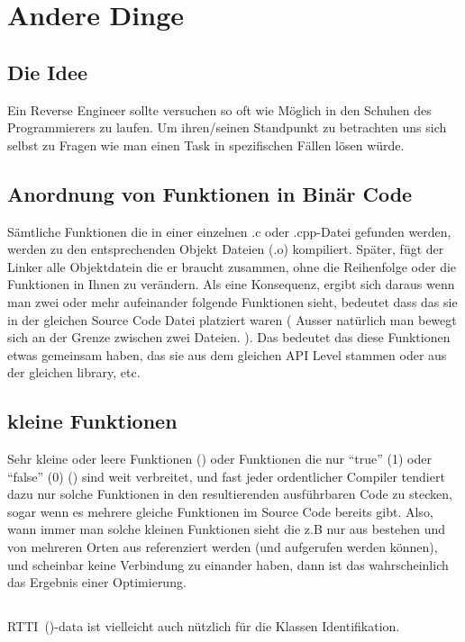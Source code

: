 \section{Andere Dinge}  %

\subsection{Die Idee}  %

Ein Reverse Engineer sollte versuchen so oft wie Möglich in den Schuhen des Programmierers zu laufen.
Um ihren/seinen Standpunkt zu betrachten uns sich selbst zu Fragen wie man einen Task in spezifischen Fällen lösen würde.

\subsection{Anordnung von Funktionen in Binär Code}  %

Sämtliche Funktionen die in einer einzelnen .c oder .cpp-Datei gefunden werden, werden zu den entsprechenden Objekt Dateien (.o) kompiliert. Später, fügt der Linker alle Objektdatein die er braucht zusammen, ohne die Reihenfolge oder die Funktionen in Ihnen zu verändern. Als eine Konsequenz, ergibt sich daraus wenn man zwei oder mehr aufeinander folgende Funktionen sieht, bedeutet dass das sie in der gleichen Source Code Datei platziert waren ( Ausser natürlich man bewegt sich an der Grenze zwischen zwei Dateien. ).  Das bedeutet
das diese Funktionen etwas gemeinsam haben, das sie aus dem gleichen \ac{API} Level stammen oder aus der gleichen library, etc.

\subsection{kleine Funktionen}  %

Sehr kleine oder leere Funktionen  ()
oder Funktionen die nur ``true'' (1) oder ``false'' (0) () sind weit verbreitet,
und fast jeder ordentlicher Compiler tendiert dazu nur solche Funktionen in den resultierenden ausführbaren Code zu stecken,
sogar wenn es mehrere gleiche Funktionen im Source Code bereits gibt. 
Also, wann immer man solche kleinen Funktionen sieht die z.B nur aus  bestehen und von mehreren 
Orten aus referenziert werden (und aufgerufen werden können), und scheinbar keine Verbindung zu einander haben, dann 
ist das wahrscheinlich das Ergebnis einer Optimierung. 

\subsection{\Cpp}

\ac{RTTI}~()-data ist vielleicht auch nützlich für die \Cpp Klassen Identifikation.




